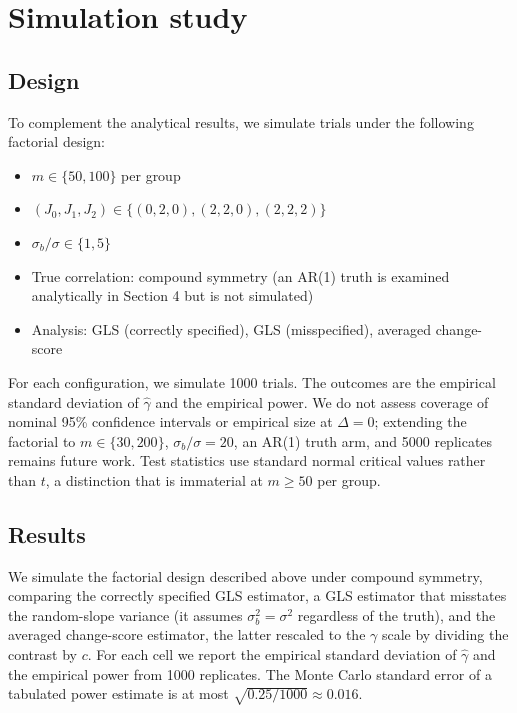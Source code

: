 \documentclass[
  11pt,
]{article}
\providecommand{\tightlist}{%
  \setlength{\itemsep}{0pt}\setlength{\parskip}{0pt}}
\begin{document}
\section{Simulation study}\label{simulation-study}

\subsection{Design}\label{design}

To complement the analytical results, we simulate
trials under the following factorial design:

\begin{itemize}
\tightlist
\item
  \(m \in \{50, 100\}\) per group
\item
  \((J_0, J_1, J_2) \in \{(0,2,0), (2,2,0), (2,2,2)\}\)
\item
  \(\sigma_b/\sigma \in \{1, 5\}\)
\item
  True correlation: compound symmetry (an AR(1) truth
  is examined analytically in Section 4 but is not
  simulated)
\item
  Analysis: GLS (correctly specified), GLS
  (misspecified), averaged change-score
\end{itemize}

For each configuration, we simulate 1000 trials. The
outcomes are the empirical standard deviation of
\(\hat\gamma\) and the empirical power. We do not assess
coverage of nominal 95\% confidence intervals or
empirical size at \(\Delta = 0\); extending the factorial
to \(m \in \{30, 200\}\), \(\sigma_b/\sigma = 20\), an
AR(1) truth arm, and 5000 replicates remains future
work. Test statistics use standard normal critical
values rather than \(t\), a distinction that is immaterial
at \(m \ge 50\) per group.

\subsection{Results}\label{results}

We simulate the factorial design described above under
compound symmetry, comparing the correctly specified GLS
estimator, a GLS estimator that misstates the random-slope
variance (it assumes \(\sigma_b^2 = \sigma^2\) regardless of
the truth), and the averaged change-score estimator, the
latter rescaled to the \(\gamma\) scale by dividing the
contrast by \(c\). For each cell we report the empirical
standard deviation of \(\hat\gamma\) and the empirical power
from 1000 replicates. The Monte Carlo standard error of a
tabulated power estimate is at most
\(\sqrt{0.25/1000} \approx 0.016\).
\end{document}
